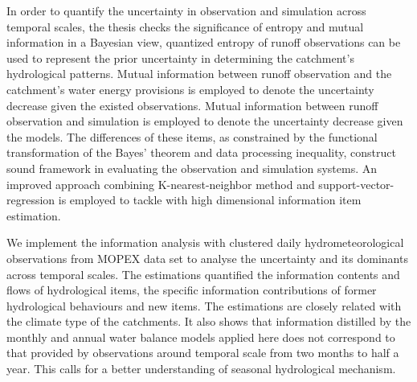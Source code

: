 \begin{eabstract}
 
In order to quantify the uncertainty in observation and simulation across temporal scales, the thesis checks the significance of entropy and mutual information in a Bayesian view,  quantized entropy of runoff observations can be used to represent the prior uncertainty in determining the catchment's hydrological patterns. Mutual information between runoff observation and the catchment's water energy provisions is employed to denote the uncertainty decrease given the existed observations. Mutual information between runoff observation and simulation is employed to denote the uncertainty decrease given the models. The differences of these items, as constrained by the functional transformation of the Bayes' theorem and data processing inequality, construct sound framework in evaluating the observation and simulation systems. An improved approach combining K-nearest-neighbor method and support-vector-regression is employed to tackle with high dimensional information item estimation. 

We implement the information analysis with clustered daily hydrometeorological observations from MOPEX data set to analyse the uncertainty and its dominants across temporal scales. The estimations quantified the  information contents and flows of hydrological items, the specific information contributions of former hydrological behaviours and new items. The estimations are closely related with the climate type of the catchments. It also shows that information distilled by the monthly and annual water balance models applied here does not correspond to that provided by observations around temporal scale from two months to half a year. This calls for a better understanding of seasonal hydrological mechanism.
 
\end{eabstract}
 









